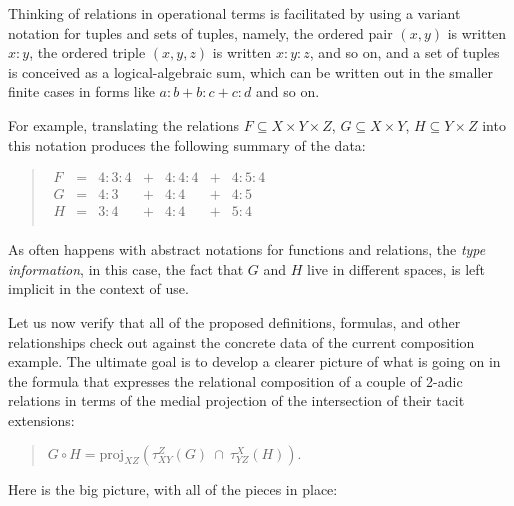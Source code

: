 \documentclass[12pt]{article}
\begin{document}
Thinking of relations in operational terms is facilitated by using a variant notation for tuples and sets of tuples, namely, the ordered pair $(x, y)$ is written $x:y$, the ordered triple $(x, y, z)$ is written $x:y:z$, and so on, and a set of tuples is conceived as a logical-algebraic sum, which can be written out in the smaller finite cases in forms like $a\mathrm{:}b + b\mathrm{:}c + c\mathrm{:}d$ and so on.

For example, translating the relations $F \subseteq X  \times Y \times Z$, $G \subseteq X \times Y$, $H \subseteq Y \times Z$ into this notation produces the following summary of the data:

\begin{quote}$\begin{array}{ccccccc}
F & = & 4:3:4 & + & 4:4:4 & + & 4:5:4 \\
G & = &  4:3  & + &  4:4  & + &  4:5  \\
H & = &  3:4  & + &  4:4  & + &  5:4  \\
\end{array}$\end{quote}

As often happens with abstract notations for functions and relations, the \textit{type information}, in this case, the fact that $G$ and $H$ live in different spaces, is left implicit in the context of use.

Let us now verify that all of the proposed definitions, formulas, and other relationships check out against the concrete data of the current composition example.  The ultimate goal is to develop a clearer picture of what is going on in the formula that expresses the relational composition of a couple of 2-adic relations in terms of the medial projection of the intersection of their tacit extensions:

\begin{quote}
$G \circ H = \mathrm{proj}_{XZ}(\tau_{XY}^Z(G)\ \cap\ \tau_{YZ}^X(H)).$
\end{quote}

Here is the big picture, with all of the pieces in place:
\end{document}
